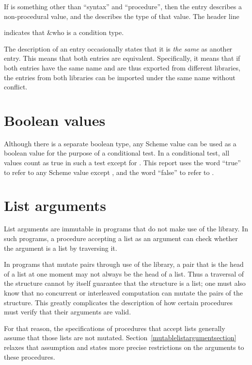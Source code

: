 If  is something other than ``syntax'' and
``procedure'', then the entry describes a non-procedural value, and
the  describes the type of that value.  The header line

\noindent{}

indicates that {\cf\&who} is a condition type.

The description of an entry occasionally states that it is \textit{the
  same} as another entry.  This means that both entries are
equivalent.  Specifically, it means that if both entries have the same
name and are thus exported from different libraries, the entries from
both libraries can be imported under the same name without conflict.

\section{Boolean values}
\label{booleanvaluessection}

Although there is a separate boolean type, any Scheme value can be
used as a boolean value for the purpose of a conditional test.  In a
conditional test, all values count as true in such a test except for
\schfalse{}.  This report uses the word ``true'' to refer to any
Scheme value except \schfalse{}, and the word ``false'' to refer to
\schfalse{}.  

\section{List arguments}
\label{listargumentssection}

List arguments are immutable in programs that do not make use of the
 library.  In such programs, a procedure accepting a list as an
argument can check whether the argument is a list by traversing it.

In programs that mutate pairs through use of the  library, a pair
that is the head of a list at one moment may not always be the head of
a list.  Thus a traversal of the structure cannot by itself guarantee
that the structure is a list; one must also know that no concurrent or
interleaved computation can mutate the pairs of the structure.
This greatly complicates the description of how certain procedures
must verify that their arguments are valid.

For that reason, the specifications of procedures that accept lists
generally assume that those lists are not mutated.
Section~\ref{mutablelistargumentsection} relaxes that assumption
and states more precise restrictions on the arguments to these
procedures.

